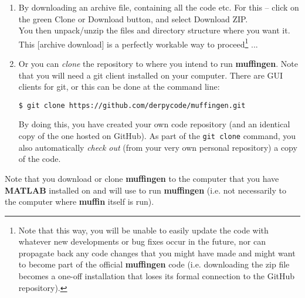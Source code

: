 \documentclass[11pt,fleqn]{book} %
\begin{document}
\vspace{2mm}
\begin{enumerate}

\vspace{1mm}
\item By downloading an archive file, containing all the code etc. For this -- click on the \textcolor[rgb]{0,0.501961,0}{green} \textsf{\small{Clone or Download}} button, and select \textsf{\small{Download ZIP}}.
\\You then unpack/unzip the files and directory structure where you want it.
\\This [archive download] is a perfectly workable way to proceed\footnote{Note that this way, you will be unable to easily update the code with whatever new developments or bug fixes occur in the future, nor can propagate back any code changes that you might have made and might want to become part of the official \textbf{muffingen} code  (i.e. downloading the \textsf{zip} file becomes a one-off installation that loses its formal connection to the GitHub repository).} ... 

\vspace{1mm}
\item Or you can \textit{clone} the repository to where you intend to run \textbf{muffingen}. Note that you will need a git client installed on your computer. There are GUI clients for git, or this can be done at the command line:

\vspace{-2mm}
\begin{verbatim}
$ git clone https://github.com/derpycode/muffingen.git
\end{verbatim}
\vspace{-2mm}

By doing this, you have created your own code repository (and an identical copy of the one hosted on GitHub). As part of the \texttt{git clone} command, you also automatically \textit{check out} (from your very own personal repository) a copy of the code.

\end{enumerate}
\vspace{2mm}

Note that you download or clone \textbf{muffingen} to the computer that you have \textbf{MATLAB} installed on and will use to run \textbf{muffingen} (i.e. not necessarily to the computer where \textbf{muffin} itself is run).

\end{document}
